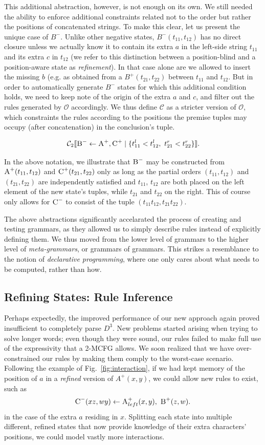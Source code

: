 \documentclass[nonatbib,numbers,10pt]{sigplanconf}
\newcommand\s{\textsc}
\newcommand{\Order}[5]{
	\[
	\mathcal{#1}_{#5}\llbracket #2 \leftarrow #3 \mid \{ #4 \} \rrbracket.
	\]
}
\newcommand{\Con}[4]{\Order{C}{#1}{#2}{#3}{#4}}
\begin{document}
This additional abstraction, however, is not enough on its own. We still needed the ability to enforce additional constraints related not to the order but rather the positions of concatenated strings. To make this clear, let us present the unique case of $B^{-}$. Unlike other negative states, $B^{-}(t_{11},t_{12})$ has no direct closure unless we actually know it to contain its extra $a$ in the left-side string $t_{11}$ and its extra $c$ in $t_{12}$ (we refer to this distinction between a position-blind and a position-aware state as \textit{refinement}). In that case alone are we allowed to insert the missing $b$ (e.g. as obtained from a $B^{+}(t_{21},t_{22})$ between $t_{11}$ and $t_{12}$. But in order to automatically generate $B^{-}$ states for which this additional condition holds, we need to keep note of the origin of the extra $a$ and $c$, and filter out the rules generated by $\mathcal{O}$ accordingly. We thus define $\mathcal{C}$ as a stricter version of $\mathcal{O}$, which constraints the rules according to the positions the premise tuples may occupy (after concatenation) in the conclusion's tuple.
\Con{\textsc{B}^-}{\textsc{A}^+, \textsc{C}^+}{t_{11}^l < t_{12}^l,\ t_{21}^r < t_{22}^r}{2}
In the above notation, we illustrate that $\textsc{B}^{-}$ may be constructed from $\textsc{A}^{+}(t_{11},t_{12})$ and $\textsc{C}^{+}(t_{21},t_{22})$ only as long as the partial orders $(t_{11},t_{12})$ and $(t_{21},t_{22})$ are independently satisfied and $t_{11}$, $t_{12}$ are both placed on the left element of the new state's tuples, while $t_{21}$ and $t_{22}$ on the right. This of course only allows for $\textsc{C}^{-}$ to consist of the tuple $(t_{11}t_{12}, t_{21}t_{22})$.

The above abstractions significantly accelarated the process of creating and testing grammars, as they allowed us to simply describe rules instead of explicitly defining them. We thus moved from the lower level of grammars to the higher level of \textit{meta-grammars}, or grammars of grammars. This strikes a resemblance to the notion of \textit{declarative programming}, where one only cares about what needs to be computed, rather than how.

\subsection{Refining States: Rule Inference}\label{aris}	
Perhaps expectedly, the improved performance of our new approach again proved insufficient to completely parse $D^3$. New problems started arising when trying to solve longer words; even though they were sound, our rules failed to make full use of the expressivity that a 2-MCFG allows. We soon realized that we have over-constrained our rules by making them comply to the worst-case scenario. Following the example of Fig.~\ref{fig:interaction}, if we had kept memory of the position of $a$ in a \textit{refined} version of  $A^{+}(x,y)$, we could allow new rules to exist, such as \[\s{C}^-(xz, wy) \leftarrow \s{A}^+_{left}(x,y),\ \s{B}^+(z,w).\] in the case of the extra $a$ residing in $x$. Splitting each state into multiple different, refined states that now provide knowledge of their extra characters' positions, we could model vastly more interactions.
\end{document}
